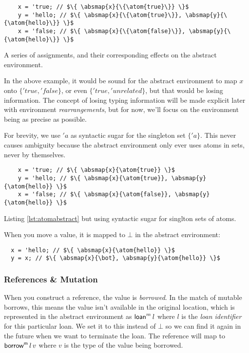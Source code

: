 \documentclass[12pt,twoside]{report}
\begin{document}
\begin{listing}[H]
  \begin{verbatim}
    x = 'true; // $\{ \absmap{x}{\{\atom{true}\}} \}$
    y = 'hello; // $\{ \absmap{x}{\{\atom{true}\}}, \absmap{y}{\{\atom{hello}\}} \}$
    x = 'false; // $\{ \absmap{x}{\{\atom{false}\}}, \absmap{y}{\{\atom{hello}\}} \}$
  \end{verbatim}
  \caption{A series of assignments, and their corresponding effects on the abstract environment.}
  \label{lst:atomabstract}
\end{listing}

In the above example, it would be sound for the abstract environment to map $x$ onto $\{'true, 'false\}$, or even $\{'true, 'unrelated\}$, but that would be losing information. The concept of losing typing information will be made explicit later with environment \textit{rearrangements}, but for now, we'll focus on the environment being as precise as possible.

For brevity, we use $'a$ as syntactic sugar for the singleton set $\{'a\}$. This never causes ambiguity because the abstract environment only ever uses atoms in sets, never by themselves.

\begin{listing}[H]
  \begin{verbatim}
    x = 'true; // $\{ \absmap{x}{\atom{true}} \}$
    y = 'hello; // $\{ \absmap{x}{\atom{true}}, \absmap{y}{\atom{hello}} \}$
    x = 'false; // $\{ \absmap{x}{\atom{false}}, \absmap{y}{\atom{hello}} \}$
  \end{verbatim}
  \caption{Listing \ref{lst:atomabstract} but using syntactic sugar for singlton sets of atoms.}
\end{listing}

When you move a value, it is mapped to $\bot$ in the abstract environment:

\begin{verbatim}
  x = 'hello; // $\{ \absmap{x}{\atom{hello}} \}$
  y = x; // $\{ \absmap{x}{\bot}, \absmap{y}{\atom{hello}} \}$
\end{verbatim}

\subsubsection{References \& Mutation}

When you construct a reference, the value is \textit{borrowed}. In the match of mutable borrows, this means the value isn't available in the original location, which is represented in the abstract environment as $\mathsf{loan}^m \, l$ where $l$ is the \textit{loan identifier} for this particular loan. We set it to this instead of $\bot$ so we can find it again in the future when we want to terminate the loan. The reference will map to $\mathsf{borrow}^{\mathsf{m}}\,l\,v$ where $v$ is the type of the value being borrowed.
\end{document}

